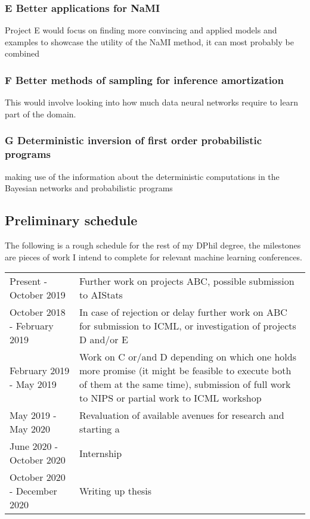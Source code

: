 \documentclass[12pt]{article}
\begin{document}
\subsubsection*{E \quad Better applications for NaMI}
Project E would focus on finding more convincing and applied models and examples to showcase the utility of the NaMI method, it can most probably be combined  


\subsubsection*{F \quad Better methods of sampling for inference amortization}
This would involve looking into how much data neural networks require to learn part of the domain.


\subsubsection*{G \quad Deterministic inversion of first order probabilistic programs}
making use of the information about the deterministic computations in the Bayesian networks and probabilistic programs\\




\subsection{Preliminary schedule}

The following is a rough schedule for the rest of my DPhil degree, the milestones are pieces of work I intend to complete for relevant machine learning conferences.

\begin{table}[h!]
\begin{tabular}{lp{11cm}}
Present - October 2019         & Further work on projects ABC, possible submission to AIStats \\
October 2018 - February 2019   & In case of rejection or delay further work on ABC for submission to ICML, or investigation of projects D and/or E \\
February 2019 - May 2019       & Work on C or/and D depending on which one holds more promise (it might be feasible to execute both of them at the same time), submission of full work to NIPS or partial work to ICML workshop \\
May 2019 - May 2020            & Revaluation of available avenues for research and starting a   \\
June 2020 - October 2020       & Internship \\
October 2020 - December 2020   & Writing up thesis
\end{tabular}
\end{table}





\newpage 

 
\end{document}

